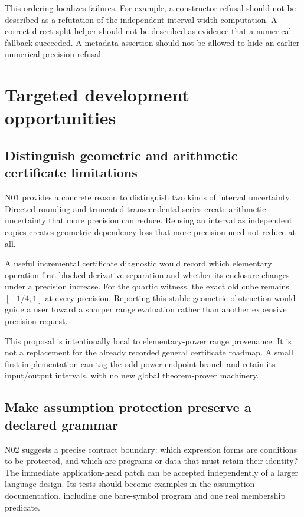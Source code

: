 \documentclass[11pt,letterpaper]{article}
\begin{document}
This ordering localizes failures. For example, a constructor refusal should not be described as a refutation of the independent interval-width computation. A correct direct split helper should not be described as evidence that a numerical fallback succeeded. A metadata assertion should not be allowed to hide an earlier numerical-precision refusal.

\section{Targeted development opportunities}
\label{sec:development}
\subsection{Distinguish geometric and arithmetic certificate limitations}

N01 provides a concrete reason to distinguish two kinds of interval uncertainty. Directed rounding and truncated transcendental series create arithmetic uncertainty that more precision can reduce. Reusing an interval as independent copies creates geometric dependency loss that more precision need not reduce at all.

A useful incremental certificate diagnostic would record which elementary operation first blocked derivative separation and whether its enclosure changes under a precision increase. For the quartic witness, the exact old cube remains $[-1/4,1]$ at every precision. Reporting this stable geometric obstruction would guide a user toward a sharper range evaluation rather than another expensive precision request.

This proposal is intentionally local to elementary-power range provenance. It is not a replacement for the already recorded general certificate roadmap. A small first implementation can tag the odd-power endpoint branch and retain its input/output intervals, with no new global theorem-prover machinery.

\subsection{Make assumption protection preserve a declared grammar}

N02 suggests a precise contract boundary: which expression forms are conditions to be protected, and which are programs or data that must retain their identity? The immediate application-head patch can be accepted independently of a larger language design. Its tests should become examples in the assumption documentation, including one bare-symbol program and one real membership predicate.
\end{document}
